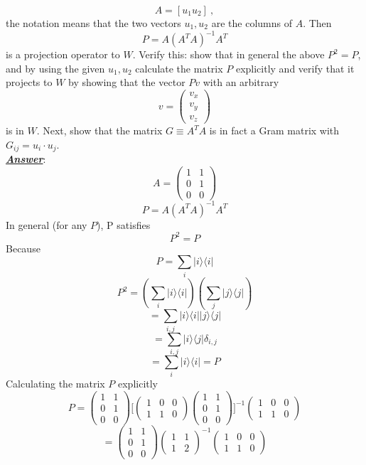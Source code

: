 \documentclass[12pt]{article}
\newcommand{\ket}[1]{\vert{#1}\rangle}
\newcommand{\bra}[1]{\langle{#1}\vert}
\begin{document}
\begin{enumerate}
$$
A = [u_1 u_2] \ , 
$$ 
the notation means that the two vectors $u_1,u_2$ are the columns of $A$. Then 
$$
P = A (A^TA)^{-1} A^T
$$
is a projection operator to $W$. Verify this:  show that in general the above $P^2=P$, and by using the given $u_1,u_2$ calculate the matrix $P$ explicitly and verify that
it projects to $W$ by showing that the vector $Pv$ with an arbitrary 
$$
v= \left( \begin{array}{c} v_x \\ v_y \\ v_z \end{array} \right) 
$$
is in $W$.  Next, show that the matrix $G\equiv A^TA$ is in fact a Gram matrix with $G_{ij}=u_i\cdot u_j$.
\\
\underline{\emph{\bf{Answer}}}: 
\\
$$ A = \left( \begin{array}{ccc} 1 & 1 \\ 0 & 1 \\ 0 & 0 \end{array} \right)$$
$$ P = A(A^T A)^{-1} A^T $$
In general (for any $P$), P satisfies 
$$ P^2 = P $$ 
Because 
$$P = \sum_i \ket{i} \bra{i} $$ 
$$ P^2 = (\sum_i \ket{i} \bra{i}) (\sum_j \ket{j} \bra{j} )$$
$$ = \sum_{i,j} \ket{i} \bra{i} \ket{j} \bra{j} $$
$$ = \sum_{i,j} \ket{i} \bra{j} \delta_{i,j} $$
$$ = \sum_i \ket{i} \bra{i} = P $$
Calculating the matrix $P$ explicitly 
$$ P = \left( \begin{array}{ccc} 1 & 1 \\ 0 & 1 \\ 0 & 0 \end{array} \right) \Bigg[ \left( \begin{array}{ccc} 1 & 0 & 0 \\ 1 & 1 & 0 \end{array} \right)\left( \begin{array}{ccc} 1 & 1 \\ 0 & 1 \\ 0 & 0 \end{array} \right)\Bigg]^{-1} \left( \begin{array}{ccc} 1 & 0 & 0 \\ 1 & 1 & 0 \end{array} \right) $$
$$ = \left( \begin{array}{ccc} 1 & 1 \\ 0 & 1 \\ 0 & 0 \end{array} \right) \left( \begin{array}{ccc} 1 & 1 \\ 1 & 2 \end{array} \right)^{-1} \left( \begin{array}{ccc} 1 & 0 & 0 \\ 1 & 1 & 0 \end{array} \right) $$

\end{enumerate}
\end{document}
